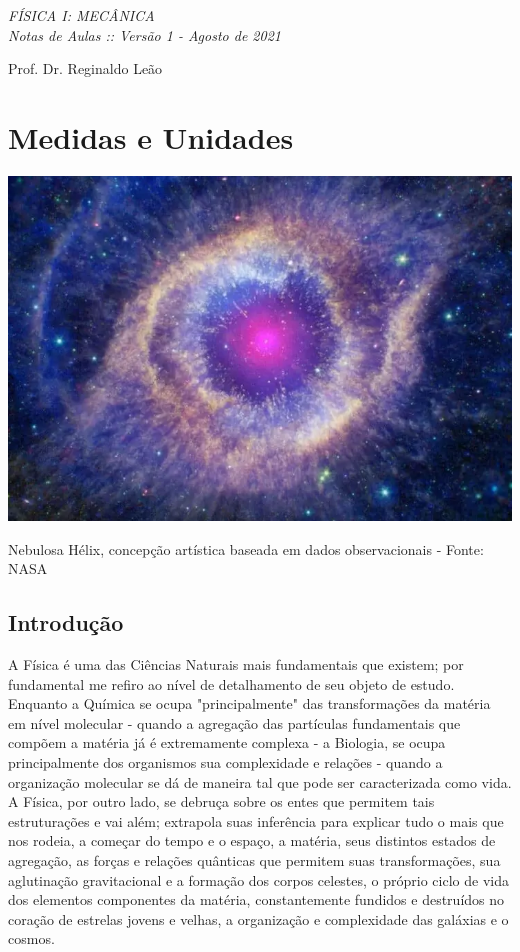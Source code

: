 \documentclass[a4paper, 11pt]{report}
\begin{document}

{\noindent
\slshape\Huge\MakeUppercase{FÍSICA I: Mecânica \\} 
Notas de Aulas :: {Versão 1 - Agosto de 2021} \par
\vskip0.3in
\noindent\large{Prof. Dr. Reginaldo Leão} \\
}\date{\today}

\chapter{Medidas e Unidades}
\begin{center}
    \includegraphics[scale=.4]{img/nebhelix.png}

    {\footnotesize Nebulosa Hélix, concepção artística baseada em dados 
    observacionais - Fonte: NASA}
\end{center}

\section{Introdução}
A Física é uma das Ciências Naturais mais fundamentais que existem; por 
fundamental me refiro ao nível de detalhamento de seu objeto de estudo. Enquanto 
a Química se ocupa "principalmente" das transformações da matéria em nível 
molecular  - quando a agregação das partículas fundamentais que compõem 
a matéria já é extremamente complexa - a Biologia, se ocupa principalmente dos 
organismos sua complexidade e relações - quando a organização molecular se dá 
de maneira tal que pode ser caracterizada como vida. A Física, por outro lado, se
debruça sobre os entes que permitem tais estruturações e vai além; extrapola 
suas inferência para explicar tudo o mais que nos rodeia, a começar do tempo e o
espaço, a matéria, seus distintos estados de agregação, as forças e relações 
quânticas que permitem suas transformações, sua aglutinação gravitacional e a 
formação dos corpos celestes, o próprio ciclo de vida dos elementos componentes
da matéria, constantemente fundidos e destruídos no coração de estrelas jovens e 
velhas, a organização e complexidade das galáxias e o cosmos.
\end{document}
